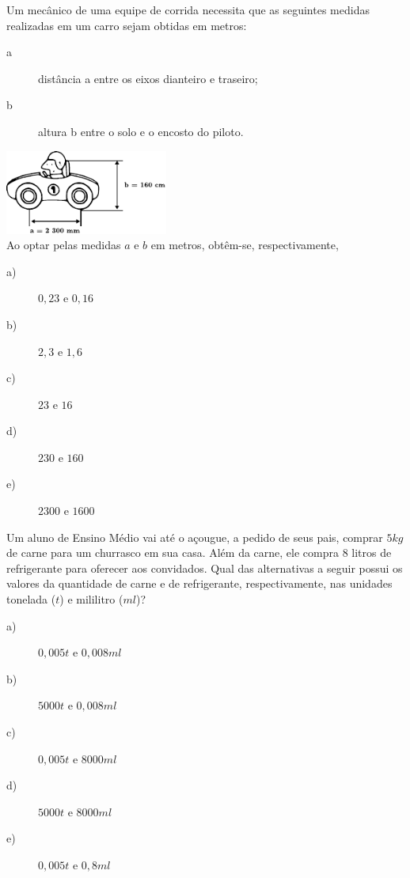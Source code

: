 \begin{exercise}[ENEM 2011]
Um mecânico de uma equipe de corrida necessita que as seguintes medidas realizadas em um carro sejam obtidas em metros:

\begin{description}
    \item[a] distância a entre os eixos dianteiro e traseiro;
    \item[b] altura b entre o solo e o encosto do piloto. 
\end{description}
\includegraphics[width=0.4\textwidth]{imagens/matematicaBasica/sistemaDeUnidades/carro.pdf}\\
Ao optar pelas medidas $a$ e $b$ em metros, obtêm-se, respectivamente,

    \begin{description}
        \item[a)] $0,23 \textrm{ e } 0,16$
        \item[b)] $2,3 \textrm{ e } 1,6$
        \item[c)] $23 \textrm{ e } 16$
        \item[d)] $230 \textrm{ e } 160$
        \item[e)] $2300 \textrm{ e } 1600$
    \end{description}

\end{exercise}

\begin{exercise}[ENEM 2011]
Um aluno de Ensino Médio vai até o açougue, a pedido de seus pais, comprar $5 kg$ de carne para um churrasco em sua casa. Além da carne, ele compra $8$ litros de refrigerante para oferecer aos convidados. Qual das alternativas a seguir possui os valores da quantidade de carne e de refrigerante, respectivamente, nas unidades tonelada ($t$) e mililitro ($ml$)?

    \begin{description}
        \item[a)] $0,005 t \textrm{ e } 0,008 ml$
        \item[b)] $5000 t \textrm{ e } 0,008 ml$
        \item[c)] $0,005 t \textrm{ e } 8000 ml$
        \item[d)] $5000 t \textrm{ e } 8000 ml$
        \item[e)] $0,005 t \textrm{ e } 0,8 ml$
    \end{description}

\end{exercise}
